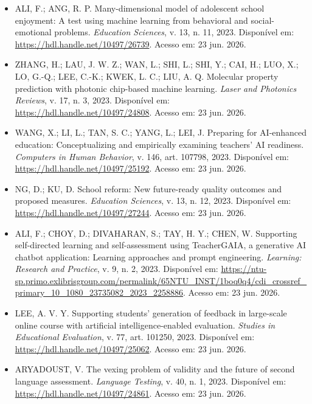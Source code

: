 \documentclass[english]{textolivre}
\begin{document}
\begin{itemize}
\item[] ALI, F.; ANG, R. P. Many-dimensional model of adolescent school enjoyment: A test using machine learning from behavioral and social-emotional problems. \textit{Education Sciences}, v. 13, n. 11, 2023. Disponível em: \url{https://hdl.handle.net/10497/26739}. Acesso em: 23 jun. 2026.

\item[] ZHANG, H.; LAU, J. W. Z.; WAN, L.; SHI, L.; SHI, Y.; CAI, H.; LUO, X.; LO, G.-Q.; LEE, C.-K.; KWEK, L. C.; LIU, A. Q. Molecular property prediction with photonic chip-based machine learning. \textit{Laser and Photonics Reviews}, v. 17, n. 3, 2023. Disponível em: \url{https://hdl.handle.net/10497/24808}. Acesso em: 23 jun. 2026.

\item[] WANG, X.; LI, L.; TAN, S. C.; YANG, L.; LEI, J. Preparing for AI-enhanced education: Conceptualizing and empirically examining teachers’ AI readiness. \textit{Computers in Human Behavior}, v. 146, art. 107798, 2023. Disponível em: \url{https://hdl.handle.net/10497/25192}. Acesso em: 23 jun. 2026.

\item[] NG, D.; KU, D. School reform: New future-ready quality outcomes and proposed measures. \textit{Education Sciences}, v. 13, n. 12, 2023. Disponível em: \url{https://hdl.handle.net/10497/27244}. Acesso em: 23 jun. 2026.

\item[] ALI, F.; CHOY, D.; DIVAHARAN, S.; TAY, H. Y.; CHEN, W. Supporting self-directed learning and self-assessment using TeacherGAIA, a generative AI chatbot application: Learning approaches and prompt engineering. \textit{Learning: Research and Practice}, v. 9, n. 2, 2023. Disponível em: \url{https://ntu-sp.primo.exlibrisgroup.com/permalink/65NTU_INST/1boq0q4/cdi_crossref_primary_10_1080_23735082_2023_2258886}. Acesso em: 23 jun. 2026.

\item[] LEE, A. V. Y. Supporting students’ generation of feedback in large-scale online course with artificial intelligence-enabled evaluation. \textit{Studies in Educational Evaluation}, v. 77, art. 101250, 2023. Disponível em: \url{https://hdl.handle.net/10497/25062}. Acesso em: 23 jun. 2026.

\item[] ARYADOUST, V. The vexing problem of validity and the future of second language assessment. \textit{Language Testing}, v. 40, n. 1, 2023. Disponível em: \url{https://hdl.handle.net/10497/24861}. Acesso em: 23 jun. 2026.


\end{itemize}
\end{document}
